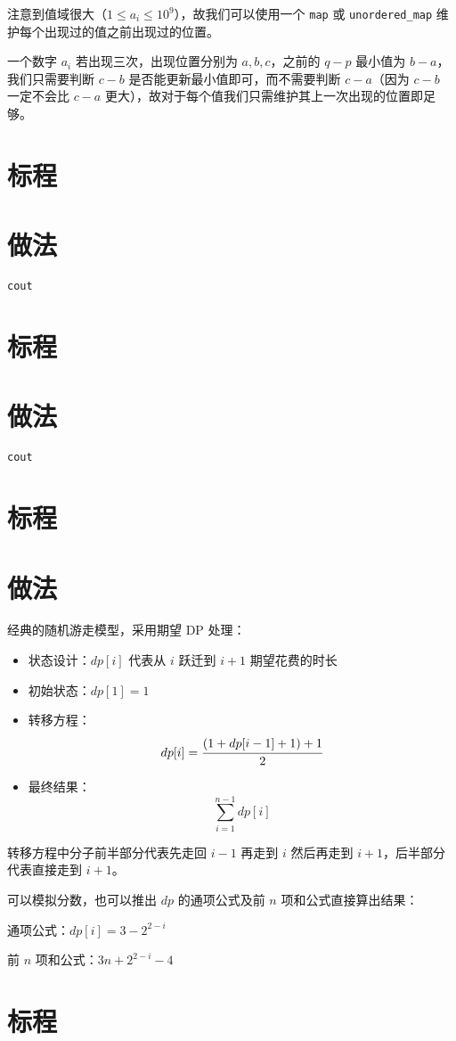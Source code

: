 \documentclass{../cpct/ctsol}
\begin{document}
注意到值域很大（$1 \leq a_i \leq {10}^9$），故我们可以使用一个 \lstinline{map} 或 \lstinline{unordered_map} 维护每个出现过的值之前出现过的位置。

一个数字 $a_i$ 若出现三次，出现位置分别为 $a,b,c$，之前的 $q-p$ 最小值为 $b-a$，我们只需要判断 $c-b$ 是否能更新最小值即可，而不需要判断 $c-a$（因为 $c-b$ 一定不会比 $c-a$ 更大），故对于每个值我们只需维护其上一次出现的位置即足够。

\section*{标程}


\makesolution
\section*{做法}

\verb|cout|

\section*{标程}


\makesolution
\section*{做法}

\verb|cout|

\section*{标程}


\makesolution
\section*{做法}

经典的随机游走模型，采用期望 DP 处理：

\begin{itemize}
    \item 状态设计：$dp[i]$ 代表从 $i$ 跃迁到 $i+1$ 期望花费的时长
    \item 初始状态：$dp[1] = 1$
    \item 转移方程：$$dp[i] = \cfrac{(1+dp[i-1]+1)+1}{2}$$
    \item 最终结果：$$\sum\limits_{i=1}^{n-1} dp[i]$$
\end{itemize}

转移方程中分子前半部分代表先走回 $i-1$ 再走到 $i$ 然后再走到 $i+1$，后半部分代表直接走到 $i+1$。

可以模拟分数，也可以推出 $dp$ 的通项公式及前 $n$ 项和公式直接算出结果：

通项公式：$dp[i] = 3-2^{2-i}$

前 $n$ 项和公式：$3n+2^{2-i}-4$

\section*{标程}

\end{document}
